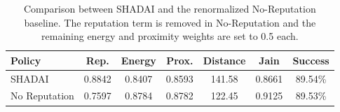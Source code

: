 \begin{table}[t]
\centering
\caption{Comparison between SHADAI and the renormalized No-Reputation baseline. The reputation term is removed in No-Reputation and the remaining energy and proximity weights are set to 0.5 each.}
\label{tab:c23_norep}
\begin{tabular}{lcccccc}
\hline
Policy & Rep. & Energy & Prox. & Distance & Jain & Success \\
\hline
SHADAI & 0.8842 & 0.8407 & 0.8593 & 141.58 & 0.8661 & 89.54\% \\
No Reputation & 0.7597 & 0.8784 & 0.8782 & 122.45 & 0.9125 & 89.53\% \\
\hline
\end{tabular}
\end{table}